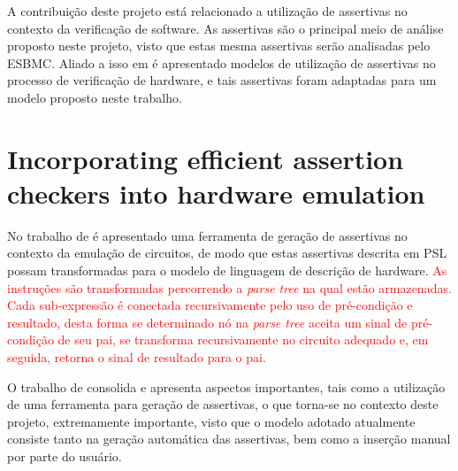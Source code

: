 \par
A contribuição deste projeto está relacionado a utilização de assertivas no contexto da verificação de software. As assertivas são o principal meio de análise proposto neste projeto, visto que estas mesma assertivas serão analisadas pelo ESBMC. Aliado a isso em \citeauthor{di2012use} é apresentado modelos de utilização de assertivas no processo de verificação de hardware, e tais assertivas foram adaptadas para um modelo proposto neste trabalho.

\section{Incorporating efficient assertion checkers into hardware emulation}
\par
No trabalho de \citeauthor{boule2005incorporating} é apresentado uma ferramenta de geração de assertivas no contexto da emulação de circuitos, de modo que estas assertivas descrita em PSL possam transformadas para o modelo de linguagem de descrição de hardware. \textcolor{red}{As instruções são transformadas percorrendo a \textit{parse tree} na qual estão armazenadas. Cada sub-expressão é conectada recursivamente pelo uso de pré-condição e resultado, desta forma se determinado nó na \textit{parse tree} aceita um sinal de pré-condição de seu pai, se transforma recursivamente no circuito adequado e, em seguida, retorna o sinal de resultado para o pai.}

\par
O trabalho de \citeauthor{boule2005incorporating} consolida e apresenta aspectos importantes, tais como a utilização de uma ferramenta para geração de assertivas, o que torna-se no contexto deste projeto, extremamente importante, visto que o modelo adotado atualmente consiste tanto na geração automática das assertivas, bem como a inserção manual por parte do usuário.
